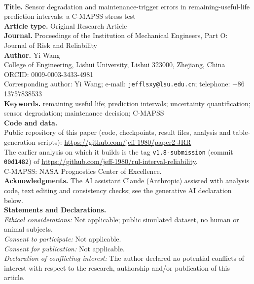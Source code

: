 \documentclass[11pt,a4paper]{article}
\begin{document}
\thispagestyle{empty}
\\[1em]
\noindent\textbf{Title.} Sensor degradation and maintenance-trigger errors in remaining-useful-life prediction intervals: a C-MAPSS stress test\\[0.6em]
\noindent\textbf{Article type.} Original Research Article\\[0.6em]
\noindent\textbf{Journal.} Proceedings of the Institution of Mechanical Engineers, Part O: Journal of Risk and Reliability\\[0.6em]
\noindent\textbf{Author.} Yi Wang\\
College of Engineering, Lishui University, Lishui 323000, Zhejiang, China\\
ORCID: 0009-0003-3433-4981\\
Corresponding author: Yi Wang; e-mail: \texttt{jefflsxy@lsu.edu.cn}; telephone: +86 13757838533\\[0.6em]
\noindent\textbf{Keywords.} remaining useful life; prediction intervals; uncertainty quantification; sensor degradation; maintenance decision; C-MAPSS\\[0.6em]
\noindent\textbf{Code and data.}\\
Public repository of this paper (code, checkpoints, result files, analysis and table-generation scripts): \url{https://github.com/jeff-1980/paper2-JRR}\\
The earlier analysis on which it builds is the tag \texttt{v1.8-submission} (commit \texttt{00d1482}) of \url{https://github.com/jeff-1980/rul-interval-reliability}.\\
C-MAPSS: NASA Prognostics Center of Excellence.\\[0.6em]
\noindent\textbf{Acknowledgments.} The AI assistant Claude (Anthropic) assisted with analysis code, text editing and consistency checks; see the generative AI declaration below.\\[0.6em]
\noindent\textbf{Statements and Declarations.}\\
\textit{Ethical considerations:} Not applicable; public simulated dataset, no human or animal subjects.\\
\textit{Consent to participate:} Not applicable.\\
\textit{Consent for publication:} Not applicable.\\
\textit{Declaration of conflicting interest:} The author declared no potential conflicts of interest with respect to the research, authorship and/or publication of this article.\\
\end{document}
